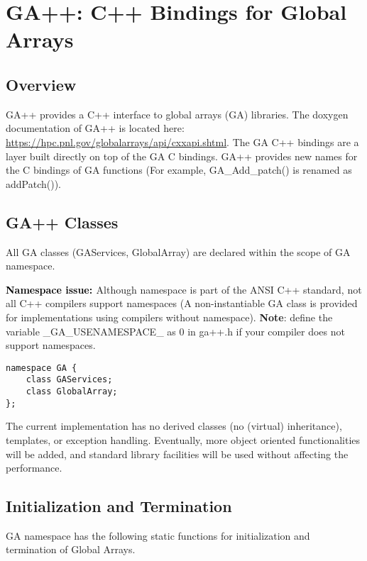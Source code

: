 \chapter{GA++: C++ Bindings for Global Arrays}

\section{Overview }

GA++ provides a C++ interface to global arrays (GA) libraries. The
doxygen documentation of GA++ is located here: \href{https://hpc.pnl.gov/globalarrays/api/cxxapi.shtml}{https://hpc.pnl.gov/globalarrays/api/cxxapi.shtml}.
The GA C++ bindings are a layer built directly on top of the GA C
bindings. GA++ provides new names for the C bindings of GA functions
(For example, GA\_Add\_patch() is renamed as addPatch()). 


\section{GA++ Classes }

All GA classes (GAServices, GlobalArray) are declared within the scope
of GA namespace.

\noindent \textbf{\textcolor{black}{Namespace issue: }}Although namespace is
part of the ANSI C++ standard, not all C++ compilers support namespaces
(A non-instantiable GA class is provided for implementations using
compilers without namespace). \textbf{Note}: define the variable \_GA\_USENAMESPACE\_
as 0 in ga++.h if your compiler does not support namespaces.

\begin{lstlisting}[style=cppnoframe]
namespace GA {
    class GAServices;
    class GlobalArray;
};
\end{lstlisting}

\noindent The current implementation has no derived classes (no (virtual) inheritance),
templates, or exception handling. Eventually, more object oriented
functionalities will be added, and standard library facilities will
be used without affecting the performance. 


\section{Initialization and Termination}

GA namespace has the following static functions for initialization
and termination of Global Arrays.


